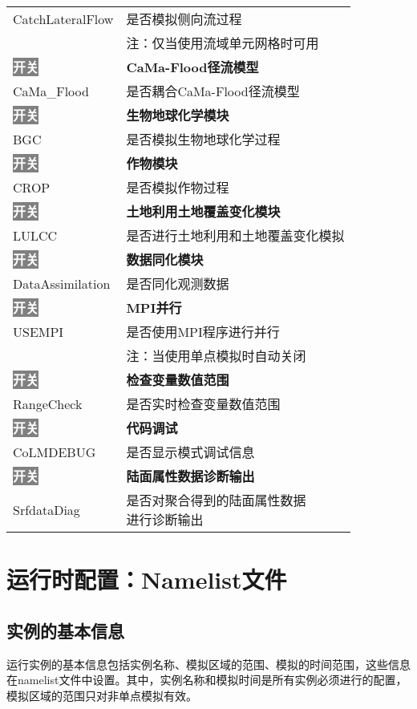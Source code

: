 {\begin{longtable}{ll}
CatchLateralFlow &  是否模拟侧向流过程 \\
 & 注：仅当使用流域单元网格时可用 \\
\hline
\colorbox{gray}{\textcolor{white}{\bf{开关}}} & \bf{CaMa-Flood径流模型} \\
CaMa\_Flood &  是否耦合CaMa-Flood径流模型 \\
\hline
\colorbox{gray}{\textcolor{white}{\bf{开关}}} & \bf{生物地球化学模块} \\
BGC &  是否模拟生物地球化学过程 \\
\hline
\colorbox{gray}{\textcolor{white}{\bf{开关}}} & \bf{作物模块} \\
CROP &  是否模拟作物过程 \\
\hline
\colorbox{gray}{\textcolor{white}{\bf{开关}}} & \bf{土地利用土地覆盖变化模块} \\
LULCC &  是否进行土地利用和土地覆盖变化模拟 \\
\hline
\colorbox{gray}{\textcolor{white}{\bf{开关}}} & \bf{数据同化模块} \\
DataAssimilation &  是否同化观测数据 \\
\hline
\colorbox{gray}{\textcolor{white}{\bf{开关}}} & \bf{MPI并行} \\
USEMPI &  是否使用MPI程序进行并行 \\
 & 注：当使用单点模拟时自动关闭 \\
\hline
\colorbox{gray}{\textcolor{white}{\bf{开关}}} & \bf{检查变量数值范围} \\
RangeCheck &  是否实时检查变量数值范围 \\
\hline
\colorbox{gray}{\textcolor{white}{\bf{开关}}} & \bf{代码调试} \\
CoLMDEBUG &  是否显示模式调试信息 \\
\hline
\colorbox{gray}{\textcolor{white}{\bf{开关}}} & \bf{陆面属性数据诊断输出} \\
SrfdataDiag &  \makecell[l]{是否对聚合得到的陆面属性数据\\进行诊断输出} \\

\end{longtable}}

\section{运行时配置：Namelist文件}\label{nml}

\subsection{实例的基本信息}
运行实例的基本信息包括实例名称、模拟区域的范围、模拟的时间范围，这些信息在namelist文件中设置。其中，实例名称和模拟时间是所有实例必须进行的配置，模拟区域的范围只对非单点模拟有效。

